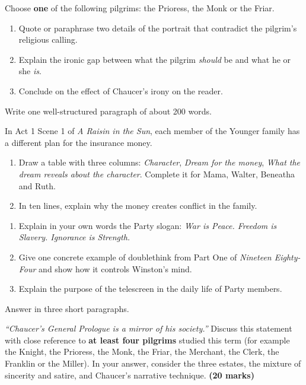 \documentclass[11pt]{article}
\newcounter{popsec}
\newcounter{popsub}
\newcommand{\courssub}[1]{%
  \stepcounter{popsub}%
  \par\vspace{9pt}\noindent{\popxbold\fontsize{11.5}{13}\selectfont\color{popink}{\color{poporange}\thepopsec.\thepopsub}\hspace{6pt}#1}\par\nopagebreak\vspace{4pt}
}
\begin{document}
\begin{exercice}
Choose \textbf{one} of the following pilgrims: the Prioress, the Monk or the Friar.
\begin{enumerate}
\item Quote or paraphrase two details of the portrait that contradict the pilgrim's religious calling.
\item Explain the ironic gap between what the pilgrim \emph{should} be and what he or she \emph{is}.
\item Conclude on the effect of Chaucer's irony on the reader.
\end{enumerate}
Write one well-structured paragraph of about 200 words.
\end{exercice}

\begin{exercice}
In Act 1 Scene 1 of \emph{A Raisin in the Sun}, each member of the Younger family has a different plan for the insurance money.
\begin{enumerate}
\item Draw a table with three columns: \emph{Character}, \emph{Dream for the money}, \emph{What the dream reveals about the character}. Complete it for Mama, Walter, Beneatha and Ruth.
\item In ten lines, explain why the money creates conflict in the family.
\end{enumerate}
\end{exercice}

\begin{exercice}
\begin{enumerate}
\item Explain in your own words the Party slogan: \emph{War is Peace. Freedom is Slavery. Ignorance is Strength.}
\item Give one concrete example of doublethink from Part One of \emph{Nineteen Eighty-Four} and show how it controls Winston's mind.
\item Explain the purpose of the telescreen in the daily life of Party members.
\end{enumerate}
Answer in three short paragraphs.
\end{exercice}

\courssub{I prepare for the GCE}

\begin{exercice}
\emph{``Chaucer's General Prologue is a mirror of his society.''} Discuss this statement with close reference to \textbf{at least four pilgrims} studied this term (for example the Knight, the Prioress, the Monk, the Friar, the Merchant, the Clerk, the Franklin or the Miller). In your answer, consider the three estates, the mixture of sincerity and satire, and Chaucer's narrative technique. \textbf{(20 marks)}
\end{exercice}
\end{document}
